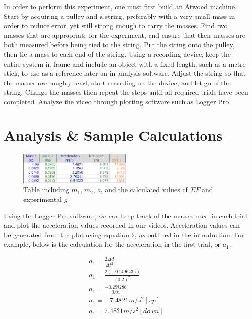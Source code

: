\documentclass[10pt,twocolumn,letterpaper]{article}
\begin{document}
In order to perform this experiment, one must first build an Atwood machine. Start by acquiring a pulley and a string, preferably with a very small mass in order to reduce error, yet still strong enough to carry the masses. Find two masses that are appropriate for the experiment, and ensure that their masses are both measured before being tied to the string. Put the string onto the pulley, then tie a mass to each end of the string. Using a recording device, keep the entire system in frame and include an object with a fixed length, such as a metre stick, to use as a reference later on in analysis software. Adjust the string so that the masses are roughly level, start recording on the device, and let go of the string. Change the masses then repeat the steps until all required trials have been completed. Analyze the video through plotting software such as Logger Pro.


\section{Analysis \& Sample Calculations}

\begin{figure}
    \centering
    \includegraphics[width=0.5\textwidth]{figures/LoggerPro_bODxuyDhbo.png}
    \caption{Table including \(m_{1}\), \(m_{2}\), \(a\), and the calculated values of \(\Sigma F\) and experimental \(g\)}
    \label{fig:enter-label}
\end{figure}

Using the Logger Pro software, we can keep track of the masses used in each trial and plot the acceleration values recorded in our videos. Acceleration values can be generated from the plot using equation 2, as outlined in the introduction. For example, below is the calculation for the acceleration in the first trial, or \(a_{1}\).

\begin{align}
    \nonumber a_{1}=\frac{2\Delta d}{\Delta t^2} \\
    \nonumber a_{1}=\frac{2(-0.149643))}{(0.2)^2} \\
    \nonumber a_{1}=\frac{-0.299286}{0.04} \\
    \nonumber a_{1}=-7.4821 m/s^2 [up] \\
    \nonumber a_{1}=7.4821 m/s^2 [down]
\end{align}
\end{document}
